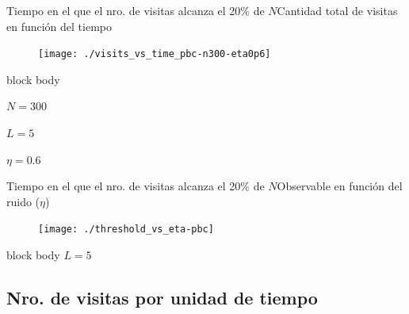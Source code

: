 \documentclass{beamer}
\begin{document}
            \begin{frame}{Tiempo en el que el nro. de visitas alcanza el 20\% de $N$}{Cantidad total de visitas en función del tiempo}
                \begin{figure}[H!]
                    \texttt{[image: ./visits\_vs\_time\_pbc-n300-eta0p6]}
                    \label{fig:pbc_2}
                \end{figure}
                \begin{beamercolorbox}[sep=5pt,center]{block body}
                    \begin{minipage}[t]{0.3\textwidth}
                        \centering
                        \small{$N=300$}
                    \end{minipage}
                    \hfill
                    \begin{minipage}[t]{0.3\textwidth}
                        \centering
                        \small{$L=5$}
                    \end{minipage}
                    \hfill
                    \begin{minipage}[t]{0.3\textwidth}
                        \centering
                        \small{$\eta=0.6$}
                    \end{minipage}
                \end{beamercolorbox}
            \end{frame}

            \begin{frame}{Tiempo en el que el nro. de visitas alcanza el 20\% de $N$}{Observable en función del ruido ($\eta$)}
                \begin{figure}[H!]
                    \texttt{[image: ./threshold\_vs\_eta-pbc]}
                    \label{fig:pbc_3}
                \end{figure}
                \begin{beamercolorbox}[sep=5pt,center]{block body}
                    \small{$L=5$}
                \end{beamercolorbox}
            \end{frame}

        \subsection{Nro. de visitas por unidad de tiempo}
\end{document}

